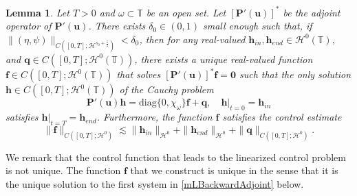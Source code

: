 \documentclass[12pt]{amsart}
\newtheorem{lemma}[theorem]{Lemma}
\theoremstyle{remark}
\theoremstyle{definition}
\numberwithin{equation}{section}
\renewcommand{\H}{{\mathcal H }}
\newcommand{\f}{\frac}
\newcommand{\T}{{\mathbb T}}
\begin{document}
\begin{lemma}\label{t:ControlH0}
Let $T>0$ and $\omega \subset \T$ be an open set. 
Let $[\mathbf{P}'(\mathbf{u})]^*$ be the adjoint operator of $\mathbf{P}'(\mathbf{u})$.
There exists $\delta_0\in (0,1)$ small enough such that, if $\| (\eta, \psi)\|_{C([0,T]; \H^{s_0 +\f52})}< \delta_0$, then for any real-valued $\mathbf{h}_{in}, \mathbf{h}_{end} \in \H^0(\T),$ and $\mathbf{q}\in C([0,T]; \H^0(\T))$, there exists a unique real-valued function $\mathbf{f}\in C([0,T]; \H^0(\T))$ that solves $[\mathbf{P}'(\mathbf{u})]^*\mathbf{f} = \mathbf{0}$ such that the only solution $\mathbf{h}\in C([0,T]; \H^0(\T))$ of the Cauchy problem
\begin{equation} \label{H0ControlEqn}
\mathbf{P}'(\mathbf{u}) \mathbf{h} =\text{diag}\{0, \chi_\omega \}\mathbf{f}+ \mathbf{q}, \quad 
\mathbf{h}|_{t=0} = \mathbf{h}_{in}
\end{equation}
satisfies $\mathbf{h}|_{t=T} = \mathbf{h}_{end}$.
Furthermore, the function $\mathbf{f}$ satisfies the control estimate
\begin{equation*}
 \|\mathbf{f}\|_{C([0,T]; \H^0)} \lesssim \|\mathbf{h}_{in}\|_{\H^0} + \|\mathbf{h}_{end}\|_{\H^0} + \|\mathbf{q}\|_{C([0,T]; \H^0)}.
\end{equation*}
\end{lemma}
We remark that the control function that leads to the linearized control problem is not unique.
The function $\mathbf{f}$ that we construct is unique in the sense that it is the unique solution to the first system in \eqref{mLBackwardAdjoint} below.
\end{document}
